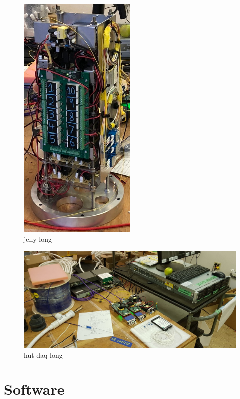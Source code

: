 \begin{figure} %
    \includegraphics[width=0.5\textwidth]{diagrams/5-daq/jelly.jpeg}
    \caption[jelly short]
    {jelly long}
    \label{fig:jelly}
\end{figure}

\begin{figure} %
    \includegraphics[width=\textwidth]{diagrams/5-daq/hut_daq.jpg}
    \caption[hut daq short]
    {hut daq long}
    \label{fig:hut_daq}
\end{figure}

\section{Software} %
\label{sec:daq_soft} %

